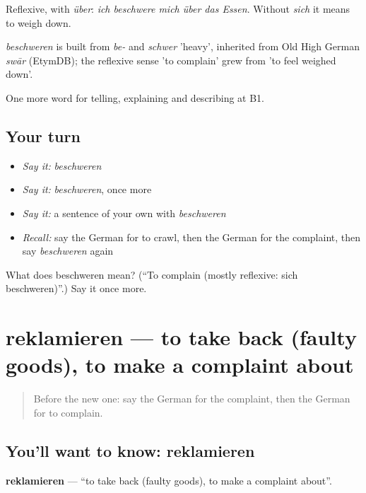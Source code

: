 Reflexive, with \emph{über}: \emph{ich beschwere mich über das Essen}. Without \emph{sich} it means to weigh down.

\begin{cousinweb}
\emph{beschweren} is built from \emph{be-} and \emph{schwer} 'heavy', inherited from Old High German \emph{swār} (EtymDB); the reflexive sense 'to complain' grew from 'to feel weighed down'.
\end{cousinweb}

\begin{grammarlens}[title={What you've built}]
One more word for telling, explaining and describing at B1.
\end{grammarlens}

\subsection*{Your turn}
\begin{itemize}
\raggedright
  \item \emph{Say it:} \emph{beschweren}
  \item \emph{Say it:} \emph{beschweren}, once more
  \item \emph{Say it:} a sentence of your own with \emph{beschweren}
  \item \emph{Recall:} say the German for to crawl, then the German for the complaint, then say \emph{beschweren} again
\end{itemize}

\begin{tcolorbox}[breakable,colback=teal!4,colframe=teal!35!black,title={Before you move on}]
What does beschweren mean? (\textquotedblleft{}To complain (mostly reflexive: sich beschweren)\textquotedblright{}.) Say it once more.
\end{tcolorbox}
\section[reklamieren]{reklamieren — to take back (faulty goods), to make a complaint about}

\label{lesson:GE-C431-reklamieren}



\begin{quote}
Before the new one: say the German for the complaint, then the German for to complain.
\end{quote}

\subsection*{You'll want to know: reklamieren}
\textbf{reklamieren} — \textquotedblleft{}to take back (faulty goods), to make a complaint about\textquotedblright{}.

